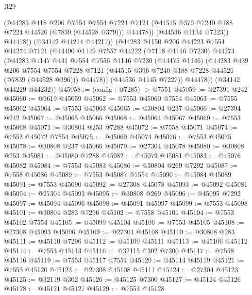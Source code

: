 \begin{lexlean}{R29}
\begin{coremodule}
                  (@44283
                    @418
                    @206
                    @7554
                    @7554
                    @7224
                    @7121
                    (@44515 @379 @7240 @188 @7224 @44526 (@7839 (@44528 @379)))
                    @44478))
                (@44536 @1134 @7223))
              @44478))
          (@34142 @44214 @44217))
        (@44283
          @1150
          @206
          @44223
          @7554
          @44274
          @7121
          (@44490
            @1149
            @7557
            @44222
            (@7118 @1146 @7230)
            @44274
            (@44283
              @1147
              @441
              @7554
              @7556
              @1146
              @7230
              (@44475 @1146)
              (@44283
                @439
                @206
                @7554
                @7554
                @7228
                @7121
                (@44515 @396 @7240 @188 @7228 @44526 (@7839 (@44528 @396)))
                @44478))
            (@44536 @1145 @7227))
          @44478))
      (@34142 @44229 @44232))
@45058 := (config : @7285) -> @7551
@45059 := @27391 @242
@45060 := @9619 @45059
@45062 := @7553 @45060 @7554
@45063 := @7555 @45062
@45064 := @7553 @45063
@45065 := @30804 @237
@45066 := @27394 @242
@45067 := @45065 @45066
@45068 := @45064 @45067
@45069 := @7553 @45068
@45071 := @30804 @253 @7288
@45072 := @7558 @45071
@45074 := @7553 @45072 @7554
@45075 := @45069 @45074
@45076 := @7553 @45075
@45078 := @30808 @237 @45066
@45079 := @27304 @45078
@45080 := @30808 @253
@45081 := @45080 @7288
@45082 := @45079 @45081
@45083 := @45076 @45082
@45084 := @7553 @45083
@45086 := @30804 @269 @7292
@45087 := @7558 @45086
@45089 := @7553 @45087 @7554
@45090 := @45084 @45089
@45091 := @7553 @45090
@45092 := @27308 @45078
@45093 := @45092 @45081
@45094 := @27304 @45093
@45095 := @30808 @269
@45096 := @45095 @7292
@45097 := @45094 @45096
@45098 := @45091 @45097
@45099 := @7553 @45098
@45101 := @30804 @283 @7296
@45102 := @7558 @45101
@45104 := @7553 @45102 @7554
@45105 := @45099 @45104
@45106 := @7553 @45105
@45108 := @27308 @45093 @45096
@45109 := @27304 @45108
@45110 := @30808 @283
@45111 := @45110 @7296
@45112 := @45109 @45111
@45113 := @45106 @45112
@45114 := @7553 @45113
@45116 := @32115 @302 @7300
@45117 := @7558 @45116
@45119 := @7553 @45117 @7554
@45120 := @45114 @45119
@45121 := @7553 @45120
@45123 := @27308 @45108 @45111
@45124 := @27304 @45123
@45125 := @32119 @302
@45126 := @45125 @7300
@45127 := @45124 @45126
@45128 := @45121 @45127
@45129 := @7553 @45128

\end{coremodule}
\end{lexlean}

